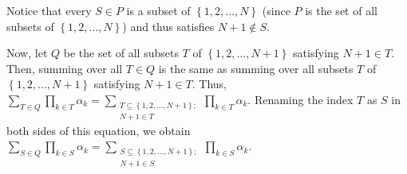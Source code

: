 \documentclass[numbers=enddot,12pt,final,onecolumn,notitlepage]{scrartcl}%
\begin{document}
Notice that every $S\in P$ is a subset of $\left\{  1,2,...,N\right\}  $
(since $P$ is the set of all subsets of $\left\{  1,2,...,N\right\}  $) and
thus satisfies $N+1\notin S$.

Now, let $Q$ be the set of all subsets $T$ of $\left\{  1,2,...,N+1\right\}  $
satisfying $N+1\in T$. Then, summing over all $T\in Q$ is the same as summing
over all subsets $T$ of $\left\{  1,2,...,N+1\right\}  $ satisfying $N+1\in
T$. Thus, $\sum\limits_{T\in Q}\prod\limits_{k\in T}\alpha_{k}=\sum
\limits_{\substack{T\subseteq\left\{  1,2,...,N+1\right\}  ;\\N+1\in T}%
}\prod\limits_{k\in T}\alpha_{k}$. Renaming the index $T$ as $S$ in both sides
of this equation, we obtain $\sum\limits_{S\in Q}\prod\limits_{k\in S}%
\alpha_{k}=\sum\limits_{\substack{S\subseteq\left\{  1,2,...,N+1\right\}
;\\N+1\in S}}\prod\limits_{k\in S}\alpha_{k}$.
\end{document}
